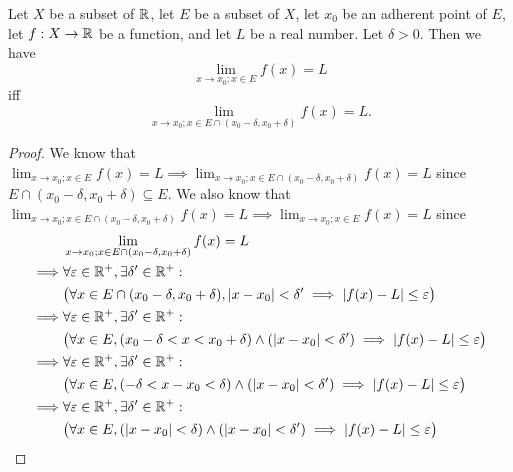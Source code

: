 \begin{prop}\label{9.3.18}
  Let \(X\) be a subset of \(\mathbb{R}\), let \(E\) be a subset of \(X\), let \(x_0\) be an adherent point of \(E\), let \(f : X \to \mathbb{R}\) be a function, and let \(L\) be a real number.
  Let \(\delta > 0\).
  Then we have
  \[
    \lim_{x \to x_0 ; x \in E} f(x) = L
  \]
  iff
  \[
    \lim_{x \to x_0 ; x \in E \cap (x_0 - \delta, x_0 + \delta)} f(x) = L.
  \]
\end{prop}

\begin{proof}
  We know that \(\lim_{x \to x_0 ; x \in E} f(x) = L \implies \lim_{x \to x_0 ; x \in E \cap (x_0 - \delta, x_0 + \delta)} f(x) = L\) since \(E \cap (x_0 - \delta, x_0 + \delta) \subseteq E\).
  We also know that \(\lim_{x \to x_0 ; x \in E \cap (x_0 - \delta, x_0 + \delta)} f(x) = L \implies \lim_{x \to x_0 ; x \in E} f(x) = L\) since
  \begin{align*}
             & \lim_{x \to x_0 ; x \in E \cap (x_0 - \delta, x_0 + \delta)} f(x) = L                                                                 \\
    \implies & \forall \varepsilon \in \R^+, \exists \delta' \in \R^+ :                                                                              \\
             & \big(\forall x \in E \cap (x_0 - \delta, x_0 + \delta), \abs{x - x_0} < \delta' \implies \abs{f(x) - L} \leq \varepsilon\big)         \\
    \implies & \forall \varepsilon \in \R^+, \exists \delta' \in \R^+ :                                                                              \\
             & \big(\forall x \in E, (x_0 - \delta < x < x_0 + \delta) \land (\abs{x - x_0} < \delta') \implies \abs{f(x) - L} \leq \varepsilon\big) \\
    \implies & \forall \varepsilon \in \R^+, \exists \delta' \in \R^+ :                                                                              \\
             & \big(\forall x \in E, (-\delta < x - x_0 < \delta) \land (\abs{x - x_0} < \delta') \implies \abs{f(x) - L} \leq \varepsilon\big)      \\
    \implies & \forall \varepsilon \in \R^+, \exists \delta' \in \R^+ :                                                                              \\
             & \big(\forall x \in E, (\abs{x - x_0} < \delta) \land (\abs{x - x_0} < \delta') \implies \abs{f(x) - L} \leq \varepsilon\big)          \\

\end{align*}
\end{proof}
